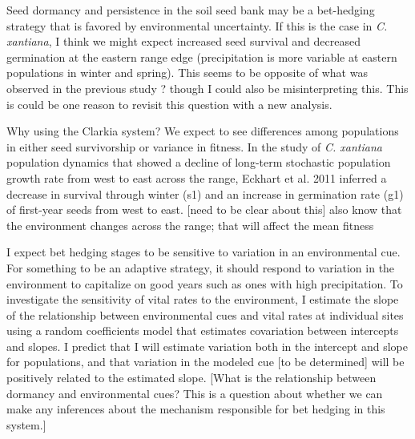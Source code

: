 \documentclass[12pt, oneside, titlepage]{article}   	%
\begin{document}
{Seed dormancy and persistence in the soil seed bank may be a bet-hedging strategy that is favored by environmental uncertainty. If this is the case in \textit{C. xantiana}, I think we might expect increased seed survival and decreased germination at the eastern range edge (precipitation is more variable at eastern populations in winter and spring). This seems to be opposite of what was observed in the previous study ? though I could also be misinterpreting this. This is could be one reason to revisit this question with a new analysis. 

Why using the Clarkia system? We expect to see differences among populations in either seed survivorship or variance in fitness. In the study of \textit{C. xantiana} population dynamics that showed a decline of long-term stochastic population growth rate from west to east across the range, Eckhart et al. 2011 inferred a decrease in survival through winter (s1) and an increase in germination rate (g1) of first-year seeds from west to east. [need to be clear about this] also know that the environment changes across the range; that will affect the mean fitness

I expect bet hedging stages to be sensitive to variation in an environmental cue. For something to be an adaptive strategy, it should respond to variation in the environment to capitalize on good years such as ones with high precipitation. To investigate the sensitivity of vital rates to the environment, I estimate the slope of the relationship between environmental cues and vital rates at individual sites using a random coefficients model that estimates covariation between intercepts and slopes. I predict that I will estimate variation both in the intercept and slope for populations, and that variation in the modeled cue [to be determined] will be positively related to the estimated slope. [What is the relationship between dormancy and environmental cues? This is a question about whether we can make any inferences about the mechanism responsible for bet hedging in this system.]

}
\end{document}
